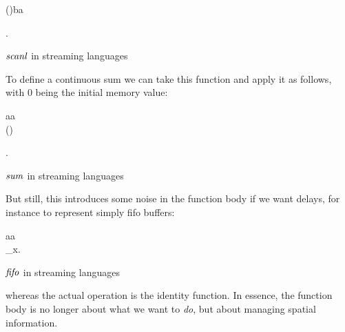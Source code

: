 \begin{source}
\begin{hscode}\SaveRestoreHook
{}%
%
\>[B]{}\mathbin{::}(\to {}\to {})\to {}\to \vec b\to \vec a{}\<[E]%
\\
\>[B]{}\;\;\;\mathrel{=}\<[E]%
\ColumnHook
\end{hscode}\resethooks
.
\caption{\ensuremath{\Varid{scanl}} in streaming languages}
\end{source}
To define a continuous sum we can take this function and apply it as follows, with 0 being the initial memory value:
\begin{source}
\begin{hscode}\SaveRestoreHook
{}%
%
\>[B]{}\mathbin{::}\vec a\to \vec a{}\<[E]%
\\
\>[B]{}\mathrel{=}\;(\mathbin{+})\;\<[E]%
\ColumnHook
\end{hscode}\resethooks
.
\caption{\ensuremath{\Varid{sum}} in streaming languages}
\end{source}
But still, this introduces some noise in the function body if we want delays, for instance to represent simply fifo buffers:
\begin{source}
\begin{hscode}\SaveRestoreHook
{}%
%
\>[B]{}\mathbin{::}\to \vec a\to \vec a{}\<[E]%
\\
\>[B]{}\;\mathrel{=}\sigma_x\;.{}\<[E]%
\ColumnHook
\end{hscode}\resethooks
\caption{\ensuremath{\Varid{fifo}} in streaming languages}
\end{source}
whereas the actual operation is the identity function.
In essence, the function body is no longer about what we want to \textit{do}, but about managing spatial information.

